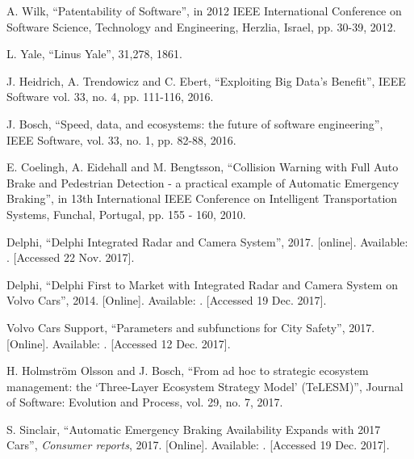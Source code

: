 \documentclass[conference]{IEEEtran}
\begin{document}
\begin{thebibliography}{00}
	A. Wilk,
	``Patentability of Software'',
	in 2012 IEEE International Conference on Software Science, Technology and Engineering,
	Herzlia, Israel,
	pp. 30-39,
	2012.
	
	L. Yale,
	``Linus Yale'',
	31,278,
	1861.
	
	J. Heidrich, A. Trendowicz and C. Ebert,
	``Exploiting Big Data's Benefit'',
	IEEE Software 
	vol. 33, no. 4, pp. 111-116,
	2016.
	
	J. Bosch,
	``Speed, data, and ecosystems: the future of software engineering'',
	IEEE Software,
	vol. 33, no. 1, pp. 82-88, 
	2016.
	
	E. Coelingh, A. Eidehall and M. Bengtsson,
	``Collision Warning with Full Auto Brake and Pedestrian Detection - a practical example of Automatic Emergency Braking'',
	in 13th International IEEE Conference on Intelligent Transportation Systems, 
	Funchal, Portugal,
	pp. 155 - 160,
	2010.
	
	Delphi,
	``Delphi Integrated Radar and Camera System'',
	2017.
	[online]. Available: .
	[Accessed 22 Nov. 2017].
	
	Delphi,
	``Delphi First to Market with Integrated Radar and Camera System on Volvo Cars'',
	2014.
	[Online]. Available: .
	[Accessed 19 Dec. 2017].
	
	Volvo Cars Support,
	``Parameters and subfunctions for City Safety'',
	2017.
	[Online]. Available: 
	.
	[Accessed 12 Dec. 2017].
	
	H. Holmstr\"{o}m Olsson and J. Bosch,
	``From ad hoc to strategic ecosystem management: the `Three-Layer Ecosystem Strategy Model' (TeLESM)'',
	Journal of Software: Evolution and Process,
	vol. 29, no. 7, 
	2017.
	
	S. Sinclair,
	``Automatic Emergency Braking Availability Expands with 2017 Cars'',
	\emph{Consumer reports},
	2017.
	[Online]. Available:
	.
	[Accessed 19 Dec. 2017].
	

\end{thebibliography}
\end{document}
